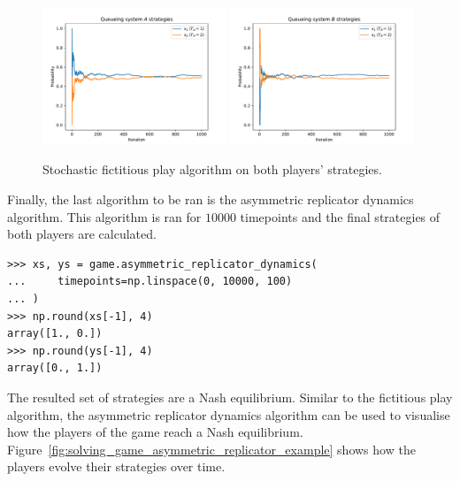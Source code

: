 \begin{figure}[H]
    \centering
    \includegraphics[width=0.49\textwidth]{chapters/04_game_theoretic_model/img/numeric_results/stochastic_fictitious_play_A.pdf}
    \includegraphics[width=0.49\textwidth]{chapters/04_game_theoretic_model/img/numeric_results/stochastic_fictitious_play_B.pdf}
    \caption{Stochastic fictitious play algorithm on both players' strategies.}
    \label{fig:solving_game_stochastic_fictitious_example}
\end{figure}

Finally, the last algorithm to be ran is the asymmetric replicator dynamics
algorithm.
This algorithm is ran for \(10000\) timepoints and the final strategies of
both players are calculated.

\begin{lstlisting}[style=pystyle]
>>> xs, ys = game.asymmetric_replicator_dynamics(
...     timepoints=np.linspace(0, 10000, 100)    
... )
>>> np.round(xs[-1], 4)
array([1., 0.])
>>> np.round(ys[-1], 4)
array([0., 1.])

\end{lstlisting}

The resulted set of strategies are a Nash equilibrium.
Similar to the fictitious play algorithm, the asymmetric replicator dynamics
algorithm can be used to visualise how the players of the game reach a Nash
equilibrium.
Figure~\ref{fig:solving_game_asymmetric_replicator_example} shows how the
players evolve their strategies over time.

